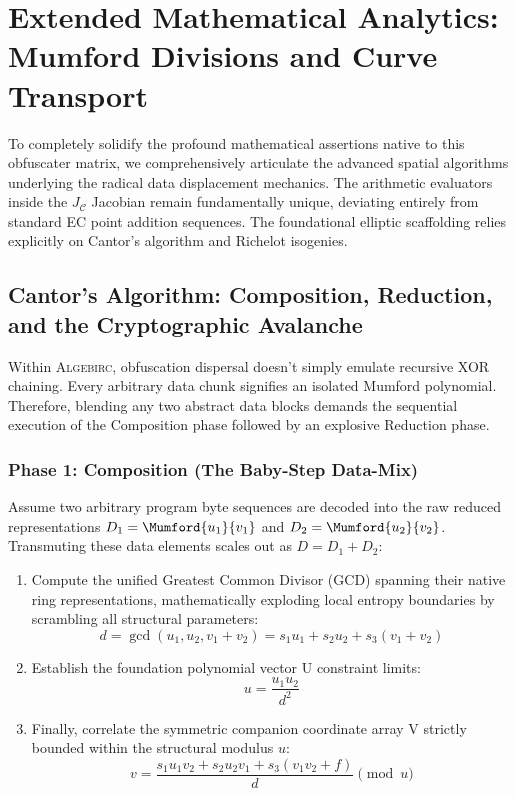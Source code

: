 \section{Extended Mathematical Analytics: Mumford Divisions and Curve Transport}
\label{sec:deep_math}

To completely solidify the profound mathematical assertions native to this obfuscater matrix, we comprehensively articulate the advanced spatial algorithms underlying the radical data displacement mechanics. The arithmetic evaluators inside the $J_\mathcal{C}$ Jacobian remain fundamentally unique, deviating entirely from standard EC point addition sequences. The foundational elliptic scaffolding relies explicitly on Cantor's algorithm and Richelot isogenies.

\subsection{Cantor's Algorithm: Composition, Reduction, and the Cryptographic Avalanche}
Within \textsc{Algebirc}, obfuscation dispersal doesn't simply emulate recursive XOR chaining. Every arbitrary data chunk signifies an isolated Mumford polynomial. Therefore, blending any two abstract data blocks demands the sequential execution of the Composition phase followed by an explosive Reduction phase.

\subsubsection{Phase 1: Composition (The Baby-Step Data-Mix)}
Assume two arbitrary program byte sequences are decoded into the raw reduced representations $D_1 = \Mumford{u_1}{v_1}$ and $D_2 = \Mumford{u_2}{v_2}$. Transmuting these data elements scales out as $D = D_1 + D_2$:
\begin{enumerate}
    \item Compute the unified Greatest Common Divisor (GCD) spanning their native ring representations, mathematically exploding local entropy boundaries by scrambling all structural parameters:
    \begin{equation}
    d = \gcd(u_1, u_2, v_1 + v_2) = s_1 u_1 + s_2 u_2 + s_3(v_1 + v_2)
    \end{equation}
    \item Establish the foundation polynomial vector U constraint limits:
    \begin{equation}
    u = \frac{u_1 u_2}{d^2}
    \end{equation}
    \item Finally, correlate the symmetric companion coordinate array V strictly bounded within the structural modulus $u$:
    \begin{equation}
    v = \frac{s_1 u_1 v_2 + s_2 u_2 v_1 + s_3(v_1 v_2 + f)}{d} \pmod{u}
    \end{equation}
\end{enumerate}

